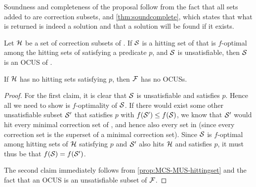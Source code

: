 Soundness and completeness of the proposal follow from the fact that all sets added to \setstohit are correction subsets, and \cref{thm:soundcomplete}, which states that what is returned is indeed a solution and that a solution will be found if it exists. 
 
 
 
\begin{theorem}\label{thm:soundcomplete}
  Let $\mathcal{H}$ be a set of correction subsets of \formula. 
  If $\mathcal{S}$ is a hitting set of  that is $f$-optimal among the hitting sets of  satisfying a predicate $p$, and  $\mathcal{S}$ is unsatisfiable, then $\mathcal{S}$ is an OCUS of \formula. 
  
  If  $\mathcal{H}$ has no hitting sets satisfying $p$, then $\mathcal{F} $ has no OCUSs.
\end{theorem}
\begin{proof}
For the first claim, it is clear that $\mathcal{S}$ is unsatisfiable and satisfies $p$. Hence all we need to show is $f$-optimality of $\mathcal{S}$.
  If there would exist some other unsatisfiable subset $\mathcal{S}'$ that satisfies $p$ with $f(\mathcal{S}')\leq f(\mathcal{S})$, we know that $\mathcal{S}'$ would hit every minimal correction set of , and hence also every set in  (since every correction set is the superset of a minimal correction set).
  Since $\mathcal{S}$ is $f$-optimal among hitting sets of $\mathcal{H}$ satisfying $p$ and $\mathcal{S}'$ also hits $\mathcal{H}$ and satisfies $p$, it must thus be that $f(\mathcal{S})=f(\mathcal{S}')$. 
%  

The second claim immediately follows from \cref{prop:MCS-MUS-hittingset} and the fact that an OCUS is an unsatisfiable subset of $\mathcal{F} $. 
\end{proof}
% 

